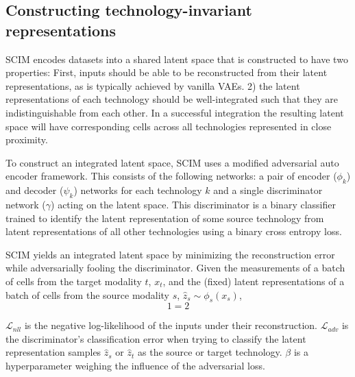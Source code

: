 \subsection{Constructing technology-invariant representations}
SCIM encodes datasets into a shared latent space that is constructed to have two properties:
First, inputs should be able to be reconstructed from their latent representations, as is typically achieved by vanilla VAEs.
2) the latent representations of each technology should be well-integrated such that they are indistinguishable from each other.
In a successful integration the resulting latent space will have corresponding cells across all technologies represented in close proximity.

To construct an integrated latent space, SCIM uses a modified adversarial auto encoder framework.
This consists of the following networks: a pair of encoder ($\phi_k$) and decoder ($\psi_k$) networks for each technology $k$ and a single discriminator network ($\gamma$) acting on the latent space.
This discriminator is a binary classifier trained to identify the latent representation of some source technology from latent representations of all other technologies using a binary cross entropy loss.

SCIM yields an integrated latent space by minimizing the reconstruction error while adversarially fooling the discriminator.
Given the measurements of a batch of cells from the target modality $t$, $x_t$, and the (fixed) latent representations of a batch of cells from the source modality $s$, $\hat{z}_s \sim \phi_s(x_s)$,
\begin{equation}
1 = 2
\end{equation}

$\mathcal{L}_{nll}$ is the negative log-likelihood of the inputs under their reconstruction.
$\mathcal{L}_{adv}$ is the discriminator’s classification error when trying to classify the latent representation samples $\hat{z}_s$ or $\hat{z}_t$ as the source or target technology.
$\beta$ is a hyperparameter weighing the influence of the adversarial loss.


